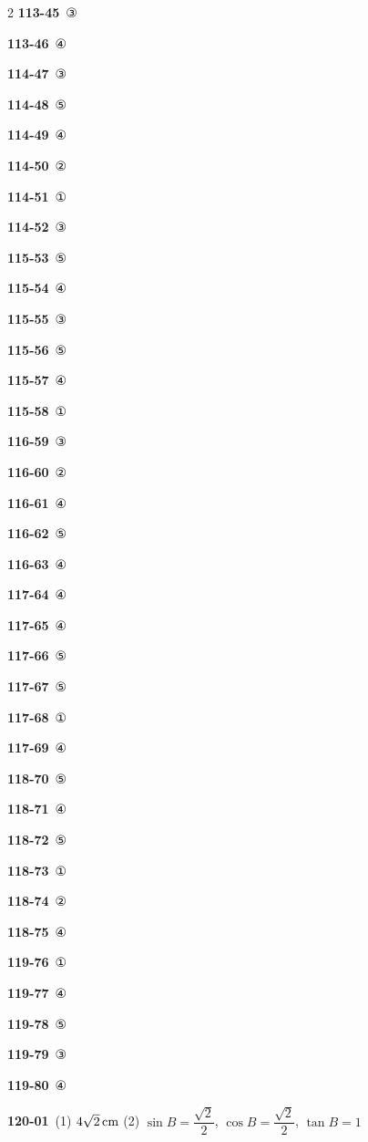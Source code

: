 \documentclass[10pt,a4paper]{article}
\begin{document}
\begin{multicols}{2}
\noindent\textbf{113-45}\ ③\par
\noindent\textbf{113-46}\ ④\par
\noindent\textbf{114-47}\ ③\par
\noindent\textbf{114-48}\ ⑤\par
\noindent\textbf{114-49}\ ④\par
\noindent\textbf{114-50}\ ②\par
\noindent\textbf{114-51}\ ①\par
\noindent\textbf{114-52}\ ③\par
\noindent\textbf{115-53}\ ⑤\par
\noindent\textbf{115-54}\ ④\par
\noindent\textbf{115-55}\ ③\par
\noindent\textbf{115-56}\ ⑤\par
\noindent\textbf{115-57}\ ④\par
\noindent\textbf{115-58}\ ①\par
\noindent\textbf{116-59}\ ③\par
\noindent\textbf{116-60}\ ②\par
\noindent\textbf{116-61}\ ④\par
\noindent\textbf{116-62}\ ⑤\par
\noindent\textbf{116-63}\ ④\par
\noindent\textbf{117-64}\ ④\par
\noindent\textbf{117-65}\ ④\par
\noindent\textbf{117-66}\ ⑤\par
\noindent\textbf{117-67}\ ⑤\par
\noindent\textbf{117-68}\ ①\par
\noindent\textbf{117-69}\ ④\par
\noindent\textbf{118-70}\ ⑤\par
\noindent\textbf{118-71}\ ④\par
\noindent\textbf{118-72}\ ⑤\par
\noindent\textbf{118-73}\ ①\par
\noindent\textbf{118-74}\ ②\par
\noindent\textbf{118-75}\ ④\par
\noindent\textbf{119-76}\ ①\par
\noindent\textbf{119-77}\ ④\par
\noindent\textbf{119-78}\ ⑤\par
\noindent\textbf{119-79}\ ③\par
\noindent\textbf{119-80}\ ④\par
\noindent\textbf{120-01}\ (1) $4\sqrt{2}\mkern3mu \mathrm{cm}$ (2) $\sin B=\dfrac{\sqrt{2}}{2}$, $\cos B=\dfrac{\sqrt{2}}{2}$, $\tan B=1$\par

\end{multicols}
\end{document}

